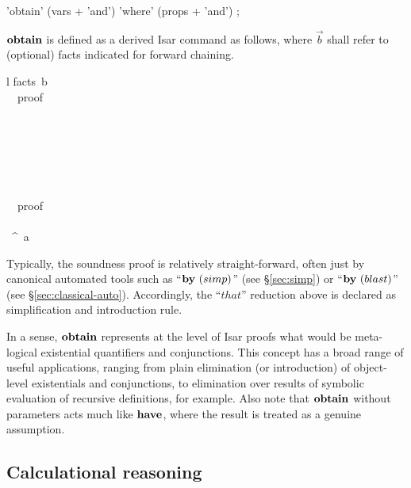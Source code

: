 \begin{rail}
  'obtain' (vars + 'and') 'where' (props + 'and')
  ;
\end{rail}

${\mathord{\mathbf{obtain}}}$ is defined as a derived Isar command as follows, where $\vec b$
shall refer to (optional) facts indicated for forward chaining.
\begin{matharray}{l}
  \langle facts~\vec b\rangle \\
  ~~\langle proof\rangle \equiv {} \\[1ex]
  \quad {} \\
  \quad {} \\
  \qquad {} \\
  \qquad {} \\
  \qquad {} \\
  \quad\qquad {} \\
  \quad\qquad {}~~\langle proof\rangle \\
  \quad \QED{} \\
  \quad {}~\ASSUMENAME^\ast~a\colon~\vec\phi \\
\end{matharray}

Typically, the soundness proof is relatively straight-forward, often just by
canonical automated tools such as ``$\BY{simp}$'' (see \S\ref{sec:simp}) or
``$\BY{blast}$'' (see \S\ref{sec:classical-auto}).  Accordingly, the
``$that$'' reduction above is declared as simplification and introduction
rule.

\medskip

In a sense, ${\mathord{\mathbf{obtain}}}$ represents at the level of Isar proofs what would be
meta-logical existential quantifiers and conjunctions.  This concept has a
broad range of useful applications, ranging from plain elimination (or
introduction) of object-level existentials and conjunctions, to elimination
over results of symbolic evaluation of recursive definitions, for example.
Also note that ${\mathord{\mathbf{obtain}}}$ without parameters acts much like ${\mathord{\mathbf{have}}}$,
where the result is treated as a genuine assumption.


\subsection{Calculational reasoning}\label{sec:calculation}


